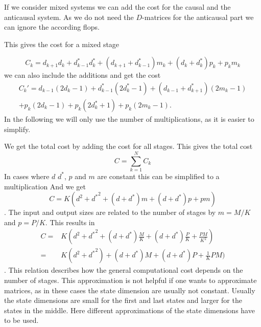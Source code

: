 \documentclass[doctype=mastersthesis,BCOR=15mm,biblatex]{ldvbook}%
\newcommand{\da}{d^*} %
\begin{document}
If we consider mixed systems we can add the cost for the causal and the anticausal system.
As we do not need the $D$-matrices for the anticausal part we can ignore the according flops.

This gives the cost for a mixed stage

\begin{equation}
C_k = d_{k+1}d_k + \da_{k-1}\da_k + (d_{k+1}+\da_{k-1})m_k +(d_k+\da_k)p_k +p_km_k 
\end{equation}
we can also include the additions and get the cost
\begin{multline}
C_k' = d_{k-1}(2d_k-1)+ \da_{k-1}(2\da_k-1) 
+ (d_{k-1}+\da_{k+1})(2m_k-1)\\
+p_k(2d_k-1)+p_k(2\da_k+1)+p_k(2m_k-1)
.
\end{multline}
In the following we will only use the number of multiplications, as it is easier to simplify.

We get the total cost by adding the cost for all stages.
This gives the total cost 
\begin{equation}
C = \sum_{k=1}^N C_k
\end{equation}
In cases where $d$ $\da$, $p$ and $m$ are constant this can be simplified to a multiplication
And we get
\begin{equation}
C = K(d^2 + {\da}^2 + (d+\da)m +(d+\da)p +pm) 
\end{equation}.
The input and output sizes are related to the number of stages by $m = M/K$ and $p=P/K$.
This results in
\begin{align}
C =& K(d^2 + {\da}^2 + (d+\da)\frac{M}{K} +(d+\da)\frac{P}{K} +\frac{PM}{K^2}) \\
=&
K(d^2 + {\da}^2) + (d+\da)M +(d+\da)P +\frac{1}{K}PM) 
\end{align}.
This relation describes how the general computational cost depends on the number of stages.
This approximation is not helpful if one wants to approximate matrices, as in these cases the state dimension are usually not constant.
Usually the state dimensions are small for the first and last states and larger for the states in the middle.
Here different approximations of the state dimensions have to be used.
\end{document}
